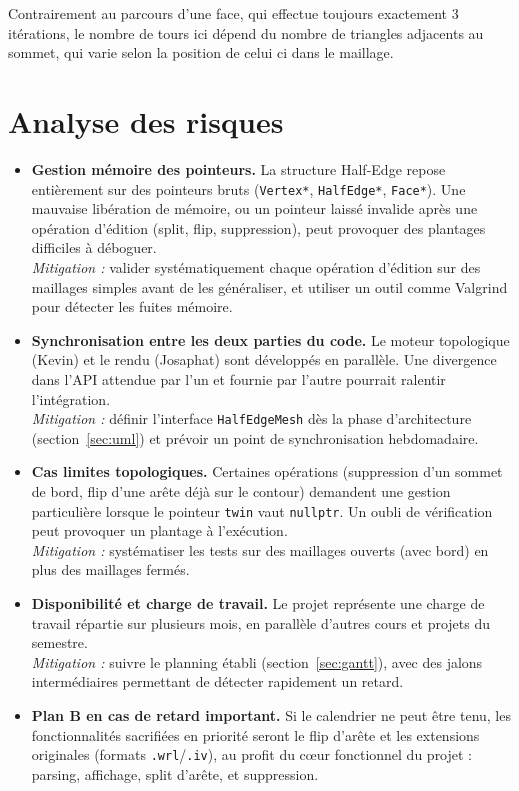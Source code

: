 Contrairement au parcours d'une face, qui effectue toujours exactement
3 itérations, le nombre de tours ici dépend du nombre de triangles
adjacents au sommet, qui varie selon la position de celui ci dans le
maillage.

\section{Analyse des risques}

\begin{itemize}
	\item \textbf{Gestion mémoire des pointeurs.} La structure
	Half-Edge repose entièrement sur des pointeurs bruts
	(\texttt{Vertex*}, \texttt{HalfEdge*}, \texttt{Face*}). Une
	mauvaise libération de mémoire, ou un pointeur laissé invalide
	après une opération d'édition (split, flip, suppression), peut
	provoquer des plantages difficiles à déboguer. \\
	\textit{Mitigation :} valider systématiquement chaque opération
	d'édition sur des maillages simples avant de les généraliser, et
	utiliser un outil comme Valgrind pour détecter les fuites mémoire.
	
	\item \textbf{Synchronisation entre les deux parties du code.}
	Le moteur topologique (Kevin) et le rendu (Josaphat) sont
	développés en parallèle. Une divergence dans l'API attendue par
	l'un et fournie par l'autre pourrait ralentir l'intégration. \\
	\textit{Mitigation :} définir l'interface \texttt{HalfEdgeMesh}
	dès la phase d'architecture (section~\ref{sec:uml}) et prévoir un
	point de synchronisation hebdomadaire.
	
	\item \textbf{Cas limites topologiques.} Certaines opérations
	(suppression d'un sommet de bord, flip d'une arête déjà sur le
	contour) demandent une gestion particulière lorsque le pointeur
	\texttt{twin} vaut \texttt{nullptr}. Un oubli de vérification
	peut provoquer un plantage à l'exécution. \\
	\textit{Mitigation :} systématiser les tests sur des maillages
	ouverts (avec bord) en plus des maillages fermés.
	
	\item \textbf{Disponibilité et charge de travail.} Le projet
	représente une charge de travail répartie sur plusieurs mois, en
	parallèle d'autres cours et projets du semestre. \\
	\textit{Mitigation :} suivre le planning établi
	(section~\ref{sec:gantt}), avec des jalons intermédiaires
	permettant de détecter rapidement un retard.
	
	\item \textbf{Plan B en cas de retard important.} Si le calendrier
	ne peut être tenu, les fonctionnalités sacrifiées en priorité
	seront le flip d'arête et les extensions originales (formats
	\texttt{.wrl}/\texttt{.iv}), au profit du cœur fonctionnel du
	projet : parsing, affichage, split d'arête, et suppression.
\end{itemize}